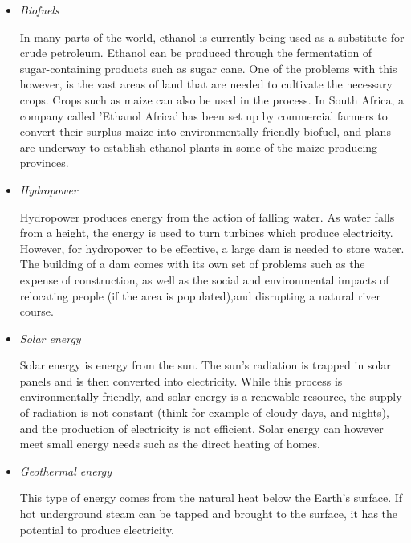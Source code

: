 \begin{itemize}
\item{\textit{Biofuels}

In many parts of the world, ethanol is currently being used as a substitute for crude petroleum. Ethanol can be produced through the fermentation of sugar-containing products such as sugar cane. One of the problems with this however, is the vast areas of land that are needed to cultivate the necessary crops. Crops such as maize can also be used in the process. 
In South Africa, a company called 'Ethanol Africa' has been set up by commercial farmers to convert their surplus maize into environmentally-friendly biofuel, and plans are underway to establish ethanol plants in some of the maize-producing provinces.}

\item{\textit{Hydropower}

Hydropower produces energy from the action of falling water. As water falls from a height, the energy is used to turn turbines which produce electricity. However, for hydropower to be effective, a large dam is needed to store water. The building of a dam comes with its own set of problems such as the expense of construction, as well as the social and environmental impacts of relocating people (if the area is populated),and disrupting a natural river course.}

\item{\textit{Solar energy}

Solar energy is energy from the sun. The sun's radiation is trapped in solar panels and is then converted into electricity. While this process is environmentally friendly, and solar energy is a renewable resource, the supply of radiation is not constant (think for example of cloudy days, and nights), and the production of electricity is not efficient. Solar energy can however meet small energy needs such as the direct heating of homes.}

\item{\textit{Geothermal energy}

This type of energy comes from the natural heat below the Earth's surface. If hot underground steam can be tapped and brought to the surface, it has the potential to produce electricity.}
\end{itemize}

